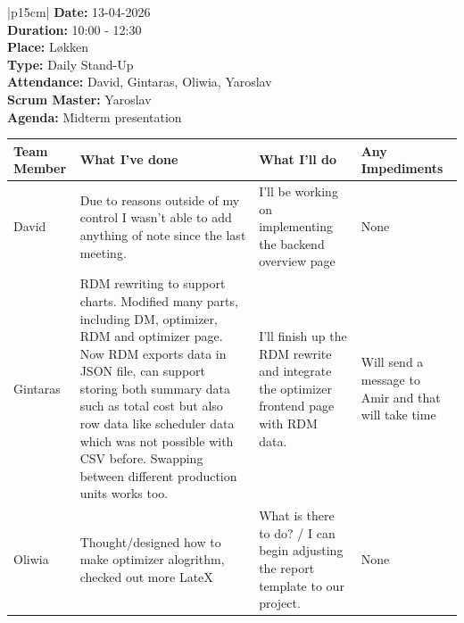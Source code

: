 \begin{table}[H]
    \centering
    \begin{tabular}{|p{15cm}|}   
        \hline
        \textbf{Date:}  13-04-2026 \\
        \textbf{Duration:} 10:00 - 12:30 \\
        \textbf{Place:}  Løkken \\
        \textbf{Type:}  Daily Stand-Up\\
        \textbf{Attendance:} David, Gintaras, Oliwia, Yaroslav \\
        \textbf{Scrum Master:}  Yaroslav \\
        \textbf{Agenda:} Midterm presentation
        \begin{table}[H]
            \begin{tabular}{|p{1.75cm}|p{4cm}|p{4cm}|p{4cm}|}
                \hline
                \cellcolor[HTML]{BFBFBF}  \textbf{Team Member} & \cellcolor[HTML]{BFBFBF}  \textbf{What I've done} & \cellcolor[HTML]{BFBFBF}  \textbf{What I'll do} & \cellcolor[HTML]{BFBFBF}  \textbf{Any Impediments}\\
                \hline
                \cellcolor[HTML]{d4d4d4} David & Due to reasons outside of my control I wasn't able to add anything of note since the last meeting. & I'll be working on implementing the backend overview page & None \\
                \hline
                \cellcolor[HTML]{d4d4d4} Gintaras & RDM rewriting to support charts. Modified many parts, including DM, optimizer, RDM and optimizer page. Now RDM exports data in JSON file, can support storing both summary data such as total cost but also row data like scheduler data which was not possible with CSV before. Swapping between different production units works too. & I'll finish up the RDM rewrite and integrate the optimizer frontend page with RDM data. & Will send a message to Amir and that will take time \\
                \hline
                \cellcolor[HTML]{d4d4d4} Oliwia & Thought/designed how to make optimizer alogrithm, checked out more LateX & What is there to do? / I can begin adjusting the report template to our project. & None \\
                \hline
            \end{tabular}
        \end{table}
         \\
        \hline
    \end{tabular}
\end{table}

